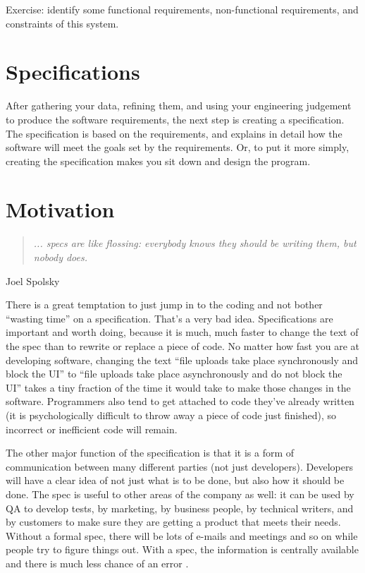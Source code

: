 {\sf Exercise: identify some functional requirements, non-functional requirements, and constraints of this system.}

\vspace{20em}


\section*{Specifications}
After gathering your data, refining them, and using your engineering judgement to produce the software requirements, the next step is creating a specification. The specification is based on the requirements, and explains in detail how the software will meet the goals set by the requirements. Or, to put it more simply, creating the specification makes you sit down and design the program.

\section*{Motivation}

\begin{quote}
	\textit{... specs are like flossing: everybody knows they should be writing them, but nobody does.}
\end{quote}
\hfill Joel Spolsky 


There is a great temptation to just jump in to the coding and not bother ``wasting time'' on a specification. That's a very bad idea. Specifications are important and worth doing, because it is much, much faster to change the text of the spec than to rewrite or replace a piece of code. No matter how fast you are at developing software, changing the text ``file uploads take place synchronously and block the UI'' to ``file uploads take place asynchronously and do not block the UI'' takes a tiny fraction of the time it would take to make those changes in the software. Programmers also tend to get attached to code they've already written (it is psychologically difficult to throw away a piece of code just finished), so incorrect or inefficient code will remain.

The other major function of the specification is that it is a form of communication between many different parties (not just developers). Developers will have a clear idea of not just what is to be done, but also how it should be done. The spec is useful to other areas of the company as well: it can be used by QA to develop tests, by marketing, by business people, by technical writers, and by customers to make sure they are getting a product that meets their needs. Without a formal spec, there will be lots of e-mails and meetings and so on while people try to figure things out. With a spec, the information is centrally available and there is much less chance of an error \cite{spolsky:fs1}.

